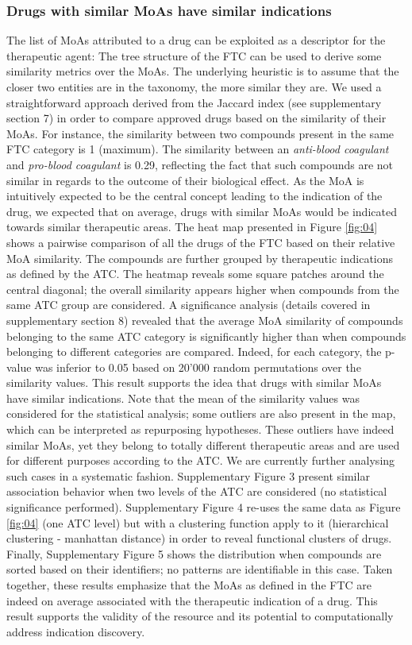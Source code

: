 \documentclass{bioinfo}
\begin{document}
\subsubsection{Drugs with similar MoAs have similar indications}
The list of MoAs attributed to a drug can be exploited as a descriptor for the therapeutic agent:
The tree structure of the FTC can be used to derive some similarity metrics over the MoAs. The underlying 
heuristic is to assume that the closer two entities are in the taxonomy, the more similar they are. 
We used a straightforward approach derived from the Jaccard index (see supplementary section 7) in order to compare 
approved drugs based on the similarity of their MoAs. For instance, the similarity between two compounds present in 
the same FTC category is 1 (maximum). The similarity between an \emph{anti-blood coagulant} and \emph{pro-blood coagulant} is 0.29, 
reflecting the fact that such compounds are not similar in regards to the outcome of their biological effect. As the MoA is 
intuitively expected to be the central concept leading to the indication of the drug, we expected that on average, drugs with 
similar MoAs would be indicated towards similar therapeutic areas. The heat map presented in Figure \ref{fig:04} shows a pairwise 
comparison of all the drugs of the FTC based on their relative MoA similarity. The compounds are further grouped by 
therapeutic indications as defined by the ATC.
The heatmap reveals some square patches around the central diagonal;
the overall similarity appears higher when compounds from the same ATC group are considered. 
A significance analysis (details covered in supplementary section 8)
revealed that the average MoA similarity of compounds belonging to the same ATC category is 
significantly higher than when compounds belonging to different categories are compared. Indeed, for 
each category, the p-value was inferior to 0.05 based on 20'000 random permutations over the similarity values. 
This result supports the idea that drugs with similar MoAs have similar indications. Note that the mean of the 
similarity values was considered for the statistical analysis; some outliers are also present in the map, which 
can be interpreted as repurposing hypotheses. These outliers have indeed similar MoAs, yet they belong to totally 
different therapeutic areas and are used for different purposes according to the ATC. We are currently further analysing 
such cases in a systematic fashion. Supplementary Figure 3 present similar association behavior when two levels of the ATC are 
considered (no statistical significance performed). Supplementary Figure 4 re-uses the same data as Figure \ref{fig:04} (one ATC level) 
but with a clustering function apply to it (hierarchical clustering - manhattan distance) in order to reveal 
functional clusters of drugs. Finally, Supplementary Figure 5 shows the distribution when compounds are sorted based on 
their identifiers; no patterns are identifiable in this case. Taken together, these results emphasize that the MoAs as 
defined in the FTC are indeed on average associated with the therapeutic indication of a drug. This result supports the validity of the
resource and its potential to computationally address indication discovery.
\end{document}
